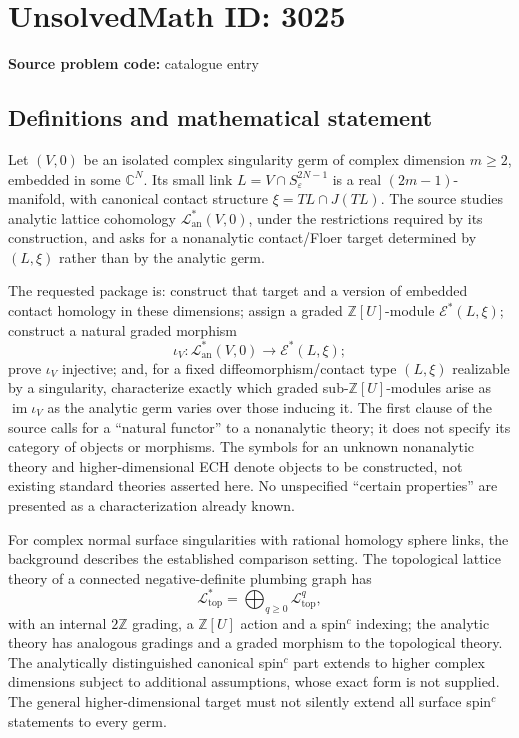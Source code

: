 \documentclass[11pt]{article}
\newcommand{\Z}{\mathbb{Z}}
\newcommand{\C}{\mathbb{C}}
\begin{document}
\section*{UnsolvedMath ID: 3025}
\textbf{Source problem code:} catalogue entry
\subsection{Definitions and mathematical statement}
Let $(V,0)$ be an isolated complex singularity germ of complex dimension $m\geq2$, embedded in some $\C^N$. Its small link $L=V\cap S^{2N-1}_\varepsilon$ is a real $(2m-1)$-manifold, with canonical contact structure $\xi=TL\cap J(TL)$. The source studies analytic lattice cohomology $\mathcal L^*_{\mathrm{an}}(V,0)$, under the restrictions required by its construction, and asks for a nonanalytic contact/Floer target determined by $(L,\xi)$ rather than by the analytic germ.

The requested package is: construct that target and a version of embedded contact homology in these dimensions; assign a graded $\Z[U]$-module $\mathcal E^*(L,\xi)$; construct a natural graded morphism
\[
\iota_{V}:\mathcal L^*_{\mathrm{an}}(V,0)\longrightarrow\mathcal E^*(L,\xi);
\]
prove $\iota_V$ injective; and, for a fixed diffeomorphism/contact type $(L,\xi)$ realizable by a singularity, characterize exactly which graded sub-$\Z[U]$-modules arise as $\operatorname{im}\iota_V$ as the analytic germ varies over those inducing it. The first clause of the source calls for a ``natural functor'' to a nonanalytic theory; it does not specify its category of objects or morphisms. The symbols for an unknown nonanalytic theory and higher-dimensional ECH denote objects to be constructed, not existing standard theories asserted here. No unspecified ``certain properties'' are presented as a characterization already known.

For complex normal surface singularities with rational homology sphere links, the background describes the established comparison setting. The topological lattice theory of a connected negative-definite plumbing graph has
\[
\mathcal L^*_{\mathrm{top}}=\bigoplus_{q\geq0}\mathcal L^q_{\mathrm{top}},
\]
with an internal $2\Z$ grading, a $\Z[U]$ action and a spin$^c$ indexing; the analytic theory has analogous gradings and a graded morphism to the topological theory. The analytically distinguished canonical spin$^c$ part extends to higher complex dimensions subject to additional assumptions, whose exact form is not supplied. The general higher-dimensional target must not silently extend all surface spin$^c$ statements to every germ.
\end{document}

